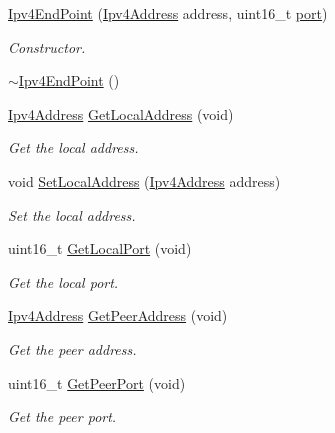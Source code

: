 \begin{DoxyCompactItemize}
\item 
\hyperlink{classns3_1_1Ipv4EndPoint_a5ad4a0fc75997cbca4f8c39b4db4eaf1}{Ipv4\+End\+Point} (\hyperlink{classns3_1_1Ipv4Address}{Ipv4\+Address} address, uint16\+\_\+t \hyperlink{visualizer-ideas_8txt_a21ff1c530daf8435e00048b7fc2c58e3}{port})
\begin{DoxyCompactList}\small\item\em Constructor. \end{DoxyCompactList}\item 
\hyperlink{classns3_1_1Ipv4EndPoint_a2feacfcc57c1ad8054f89495cf4e075c}{$\sim$\+Ipv4\+End\+Point} ()
\item 
\hyperlink{classns3_1_1Ipv4Address}{Ipv4\+Address} \hyperlink{classns3_1_1Ipv4EndPoint_ae08283e26ace5880c3172ea5d803b6f8}{Get\+Local\+Address} (void)
\begin{DoxyCompactList}\small\item\em Get the local address. \end{DoxyCompactList}\item 
void \hyperlink{classns3_1_1Ipv4EndPoint_a2b8ad9db8b266a73ee14118025fa5b03}{Set\+Local\+Address} (\hyperlink{classns3_1_1Ipv4Address}{Ipv4\+Address} address)
\begin{DoxyCompactList}\small\item\em Set the local address. \end{DoxyCompactList}\item 
uint16\+\_\+t \hyperlink{classns3_1_1Ipv4EndPoint_aab137f64770abf94f0b8a81217a0b106}{Get\+Local\+Port} (void)
\begin{DoxyCompactList}\small\item\em Get the local port. \end{DoxyCompactList}\item 
\hyperlink{classns3_1_1Ipv4Address}{Ipv4\+Address} \hyperlink{classns3_1_1Ipv4EndPoint_a3faf5ec4dce2e951a6ade79758e2075d}{Get\+Peer\+Address} (void)
\begin{DoxyCompactList}\small\item\em Get the peer address. \end{DoxyCompactList}\item 
uint16\+\_\+t \hyperlink{classns3_1_1Ipv4EndPoint_a0954ccf4be313b3a2992894ae2baf1c6}{Get\+Peer\+Port} (void)
\begin{DoxyCompactList}\small\item\em Get the peer port. \end{DoxyCompactList}\item 

\end{DoxyCompactItemize}
